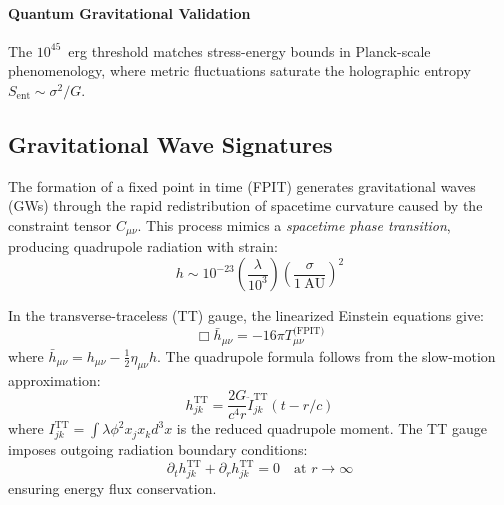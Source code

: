 \documentclass[twocolumn]{article}
\begin{document}
	\paragraph{Quantum Gravitational Validation}
	The $10^{45}$~erg threshold matches stress-energy bounds in Planck-scale phenomenology\cite{Addazi2022}, where metric fluctuations saturate the holographic entropy \(S_{\text{ent}} \sim \sigma^2/G\).
	
	\subsection{Gravitational Wave Signatures}\label{subsec:gw}
	
	The formation of a fixed point in time (FPIT) generates gravitational waves (GWs) through the rapid redistribution of spacetime curvature caused by the constraint tensor \(C_{\mu\nu}\). This process mimics a \textit{spacetime phase transition}, producing quadrupole radiation with strain:  
	\begin{equation}
		h \sim 10^{-23} \left(\frac{\lambda}{10^3}\right) \left(\frac{\sigma}{1\ \text{AU}}\right)^2
\label{eq:gw_strain}
	\end{equation}
	
	In the transverse-traceless (TT) gauge, the linearized Einstein equations give:
	\begin{equation}
		\Box \bar{h}_{\mu\nu} = -16\pi T_{\mu\nu}^{\text{(FPIT)}}
	\end{equation}
	where $\bar{h}_{\mu\nu} = h_{\mu\nu} - \frac{1}{2}\eta_{\mu\nu}h$. The quadrupole formula follows from the slow-motion approximation:
	\begin{equation}
		h_{jk}^{\text{TT}} = \frac{2G}{c^4 r} \ddot{I}_{jk}^{\text{TT}}(t-r/c)
	\end{equation}
	where $I_{jk}^{\text{TT}} = \int \lambda \phi^2 x_j x_k d^3x$ is the reduced quadrupole moment. The TT gauge imposes outgoing radiation boundary conditions:
	\begin{equation}
		\partial_t h_{jk}^{\text{TT}} + \partial_r h_{jk}^{\text{TT}} = 0 \quad \text{at } r \to \infty
	\end{equation}
	ensuring energy flux conservation\cite{MTW1973}.
	
\end{document}
